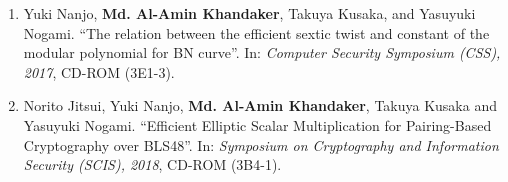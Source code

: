 \begin{enumerate}
	\item Yuki Nanjo,  \textbf{Md. Al-Amin Khandaker}, Takuya Kusaka, and  Yasuyuki Nogami. ``The relation between the efficient sextic twist and constant of the modular polynomial for BN curve''. In: \textit{Computer Security Symposium  (CSS),  2017}, CD-ROM (3E1-3). 
	
	\item  Norito Jitsui, Yuki Nanjo, \textbf{Md. Al-Amin Khandaker}, Takuya Kusaka and Yasuyuki Nogami. ``Efficient Elliptic Scalar Multiplication for Pairing-Based Cryptography over BLS48''. In:  \textit{Symposium on Cryptography and Information Security (SCIS),  2018}, CD-ROM (3B4-1).
\end{enumerate}
\normalsize


